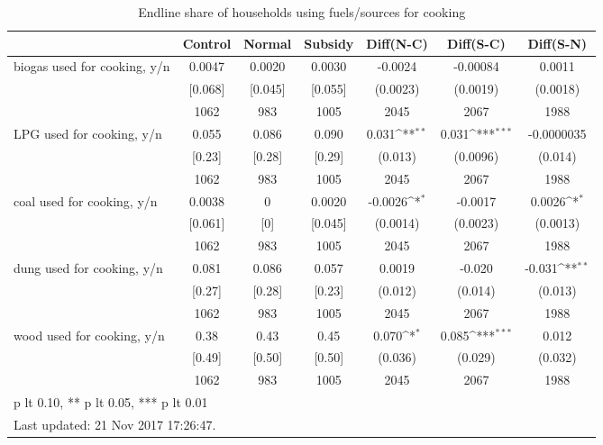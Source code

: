 \begin{table}[htbp]\centering
\def\sym#1{\ifmmode^{#1}\else\(^{#1}\)\fi}
\caption{Endline share of households using fuels/sources for cooking \label{tab:"balance"}}
\begin{tabular*}{1\hsize}{@{\hskip\tabcolsep\extracolsep\fill}l*{1}{cccccc}}
\toprule
                                &  Control&   Normal&  Subsidy&Diff(N-C)         &Diff(S-C)         &Diff(S-N)         \\
\midrule
biogas used for cooking, y/n    &   0.0047&   0.0020&   0.0030&  -0.0024         & -0.00084         &   0.0011         \\
                                &  [0.068]&  [0.045]&  [0.055]& (0.0023)         & (0.0019)         & (0.0018)         \\
                                &     1062&      983&     1005&     2045         &     2067         &     1988         \\
LPG used for cooking, y/n       &    0.055&    0.086&    0.090&    0.031\sym{**} &    0.031\sym{***}&-0.0000035         \\
                                &   [0.23]&   [0.28]&   [0.29]&  (0.013)         & (0.0096)         &  (0.014)         \\
                                &     1062&      983&     1005&     2045         &     2067         &     1988         \\
coal used for cooking, y/n      &   0.0038&        0&   0.0020&  -0.0026\sym{*}  &  -0.0017         &   0.0026\sym{*}  \\
                                &  [0.061]&      [0]&  [0.045]& (0.0014)         & (0.0023)         & (0.0013)         \\
                                &     1062&      983&     1005&     2045         &     2067         &     1988         \\
dung used for cooking, y/n      &    0.081&    0.086&    0.057&   0.0019         &   -0.020         &   -0.031\sym{**} \\
                                &   [0.27]&   [0.28]&   [0.23]&  (0.012)         &  (0.014)         &  (0.013)         \\
                                &     1062&      983&     1005&     2045         &     2067         &     1988         \\
wood used for cooking, y/n      &     0.38&     0.43&     0.45&    0.070\sym{*}  &    0.085\sym{***}&    0.012         \\
                                &   [0.49]&   [0.50]&   [0.50]&  (0.036)         &  (0.029)         &  (0.032)         \\
                                &     1062&      983&     1005&     2045         &     2067         &     1988         \\
\bottomrule
\multicolumn{7}{l}{\footnotesize * p lt 0.10, ** p lt 0.05, *** p lt 0.01}\\
\multicolumn{7}{l}{\footnotesize Last updated: 21 Nov 2017 17:26:47.}\\
\end{tabular*}
\end{table}
